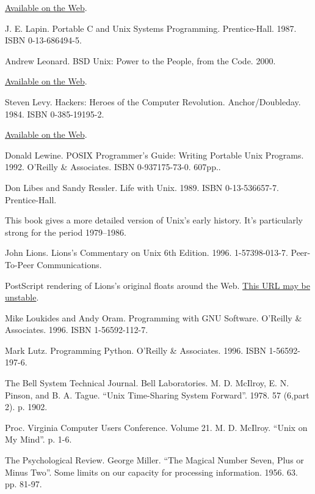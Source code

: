 \documentclass[12pt,oneside]{ctexbook}
\begin{document}
\begin{common-format}
\begin{thebibliography}{9}
\href{http://research.microsoft.com/~lampson/33-Hints/WebPage.html}{Available on the Web}.

 J. E. Lapin. Portable C and Unix Systems Programming. Prentice-Hall. 1987. ISBN 0-13-686494-5.

 Andrew Leonard. BSD Unix: Power to the People, from the Code. 2000.

\href{http://dir.salon.com/tech/fsp/2000/05/16/chapter_2_part_one/index.html}{Available on the Web}.

 Steven Levy. Hackers: Heroes of the Computer Revolution. Anchor/Doubleday. 1984. ISBN 0-385-19195-2.

\href{http://www.stanford.edu/group/mmdd/SiliconValley/Levy/Hackers.1984.book/contents.html}{Available on the Web}.

 Donald Lewine. POSIX Programmer's Guide: Writing Portable Unix Programs. 1992. O'Reilly \&{} Associates. ISBN 0-937175-73-0. 607pp..

 Don Libes and Sandy Ressler. Life with Unix. 1989. ISBN 0-13-536657-7. Prentice-Hall.

This book gives a more detailed version of Unix's early history. It's particularly strong for the period 1979–1986.

 John Lions. Lions's Commentary on Unix 6th Edition. 1996. 1-57398-013-7. Peer-To-Peer Communications.

PostScript rendering of Lions's original floats around the Web. \href{http://www.upl.cs.wisc.edu/~epaulson/lionc.ps}{This URL may be unstable}.

 Mike Loukides and Andy Oram. Programming with GNU Software. O'Reilly \&{} Associates. 1996. ISBN 1-56592-112-7.

 Mark Lutz. Programming Python. O'Reilly \&{} Associates. 1996. ISBN 1-56592-197-6.

 The Bell System Technical Journal. Bell Laboratories. M. D. McIlroy, E. N. Pinson, and B. A. Tague. “Unix Time-Sharing System Forward”. 1978. 57 (6,part 2). p. 1902.

 Proc. Virginia Computer Users Conference. Volume 21. M. D. McIlroy. “Unix on My Mind”. p. 1-6.

 The Psychological Review. George Miller. “The Magical Number Seven, Plus or Minus Two”. Some limits on our capacity for processing information. 1956. 63. pp. 81-97.


\end{thebibliography}
\end{common-format}
\end{document}
